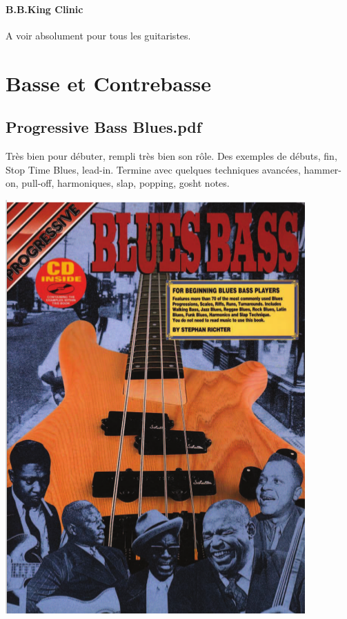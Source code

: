 \documentclass[a4paper]{book}
\begin{document}
\subsubsection{B.B.King Clinic}
A voir absolument pour tous les guitaristes.


\clearpage

\chapter[Basse et Contrebasse]{Basse et Contrebasse}
\hypertarget{RefHeadingToc277322781263}{}

\section{Progressive Bass Blues.pdf}

Très bien pour débuter, rempli très bien son rôle.
Des exemples de débuts, fin, Stop Time Blues, lead-in. Termine avec quelques techniques avancées, hammer-on, pull-off, harmoniques, slap, popping, gosht notes.

\begin{center}
\includegraphics[width=11.481cm,height=15.82cm]{lebluessupportsmethodes-img143.png}
\end{center}
\end{document}
